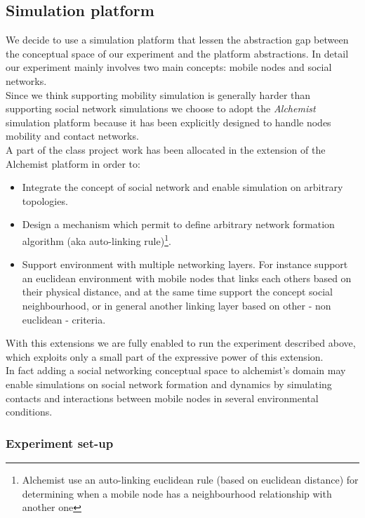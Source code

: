 \subsection{Simulation platform}
\label{exp_platform}

We decide to use a simulation platform that lessen the abstraction gap between the conceptual space of our experiment and the platform abstractions. In detail our experiment mainly involves two main concepts: mobile nodes and social networks.\\
Since we think supporting mobility simulation is generally harder than supporting social network simulations we choose to adopt the \emph{Alchemist} simulation platform\cite{pianini-jos2013} because it has been explicitly designed to handle nodes mobility and contact networks.\\
A part of the class project work has been allocated in the extension of the Alchemist platform in order to: 
\begin{itemize}
\item Integrate the concept of social network and enable simulation on arbitrary topologies.
\item Design a mechanism which permit to define arbitrary network formation algorithm (aka auto-linking rule)\footnote{Alchemist use an auto-linking euclidean rule (based on euclidean distance) for determining when a mobile node has a neighbourhood relationship with another one}.
\item Support environment with multiple networking layers. For instance support an euclidean environment with mobile nodes that links each others based on their physical distance, and at the same time support the concept social neighbourhood, or in general another linking layer based on other - non euclidean - criteria.
\end{itemize}

With this extensions we are fully enabled to run the experiment described above, which exploits only a small part of the expressive power of this extension.\\
In fact adding a social networking conceptual space to alchemist's domain may enable simulations on social network formation and dynamics by simulating contacts and interactions between mobile nodes in several environmental conditions.\\


\subsubsection{Experiment set-up}
\label{exp_setup}

